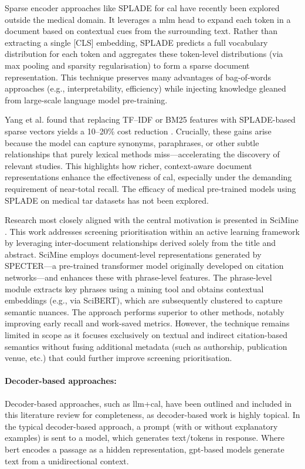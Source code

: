 \documentclass[10pt,oneside]{book}
\begin{document}
Sparse encoder approaches like SPLADE for \gls*{cal} have recently been explored outside the medical domain. It leverages a \gls*{mlm} head to expand each token in a document based on contextual cues from the surrounding text. Rather than extracting a single [CLS] embedding, SPLADE predicts a full vocabulary distribution for each token and aggregates these token-level distributions (via max pooling and sparsity regularisation) to form a sparse document representation. This technique preserves many advantages of bag-of-words approaches (e.g., interpretability, efficiency) while injecting knowledge gleaned from large-scale language model pre-training.

Yang et al. found that replacing TF–IDF or BM25 features with SPLADE-based sparse vectors yields a 10–20\% cost reduction \cite{yang_contextualization_2024}. Crucially, these gains arise because the model can capture synonyms, paraphrases, or other subtle relationships that purely lexical methods miss—accelerating the discovery of relevant studies. This highlights how richer, context-aware document representations enhance the effectiveness of \gls*{cal}, especially under the demanding requirement of near-total recall. The efficacy of medical pre-trained models using SPLADE on medical \gls*{tar} datasets has not been explored.

Research most closely aligned with the central motivation is presented in SciMine \cite{guo_scimine_2023}. This work addresses screening prioritisation within an active learning framework by leveraging inter-document relationships derived solely from the title and abstract. SciMine employs document-level representations generated by SPECTER—a pre-trained transformer model originally developed on citation networks—and enhances these with phrase-level features. The phrase-level module extracts key phrases using a mining tool and obtains contextual embeddings (e.g., via SciBERT), which are subsequently clustered to capture semantic nuances. The approach performs superior to other methods, notably improving early recall and work-saved metrics. However, the technique remains limited in scope as it focuses exclusively on textual and indirect citation-based semantics without fusing additional metadata (such as authorship, publication venue, etc.) that could further improve screening prioritisation.


\paragraph{Decoder-based approaches:}
Decoder-based approaches, such as \gls*{llm}+\gls*{cal}, have been outlined and included in this literature review for completeness, as decoder-based work is highly topical. In the typical decoder-based approach, a prompt (with or without explanatory examples) is sent to a model, which generates text/tokens in response. Where \gls*{bert} encodes a passage as a hidden representation, \gls*{gpt}-based models generate text from a unidirectional context.
\end{document}

